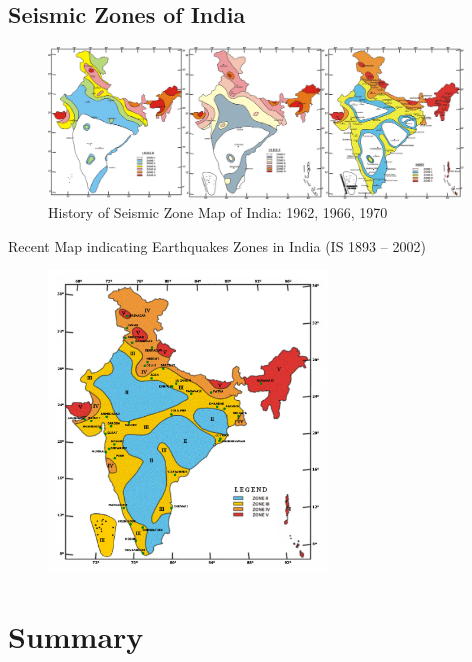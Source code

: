 \documentclass[smaller]{beamer}
\begin{document}
\subsection{Seismic Zones of India}
\begin{frame}
\begin{figure}
\includegraphics[width=11cm]{hsz.png}
\caption{History of Seismic Zone Map of India: 1962, 1966, 1970}
\end{figure}
\end{frame}
\begin{frame}
\tiny{Recent Map indicating Earthquakes Zones in India (IS 1893 – 2002)}
\begin{figure}
\includegraphics[height=8cm]{sz.png}
\end{figure}
\end{frame}

\section*{Summary}
\end{document}
